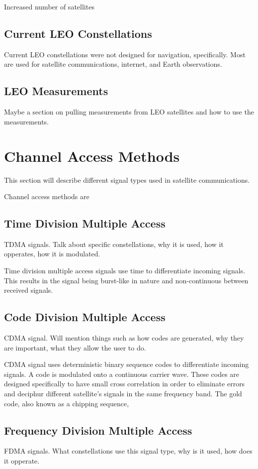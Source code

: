 \documentclass[12pt]{report}
\begin{document}
Increased number of satellites

\subsection{Current LEO Constellations}
Current LEO constellations were not designed for navigation, specifically. Most are used for satellite communications, internet, and Earth observations. 

\subsection{LEO Measurements}
Maybe a section on pulling measurements from LEO satellites and how to use the measurements. 

\section{Channel Access Methods}
This section will describe different signal types used in satellite communications.

Channel access methods are 
\subsection{Time Division Multiple Access}
TDMA signals. Talk about specific constellations, why it is used, how it opperates, how it is modulated. 

Time division multiple access signals use time to differentiate incoming signals. This results in the signal being burst-like in nature and non-continuous between received signals. 

\subsection{Code Division Multiple Access}
CDMA signal. Will mention things such as how codes are generated, why they are important, what they allow the user to do.

CDMA signal uses deterministic binary sequence codes to differentiate incoming signals. A code is modulated onto a continuous carrier wave. These codes are designed specifically to have small cross correlation in order to eliminate errors and deciphur different satellite's signals in the same frequency band. The gold code, also known as a chipping sequence, 

\subsection{Frequency Division Multiple Access}
FDMA signals. What constellations use this signal type, why is it used, how does it opperate. 
\end{document}
